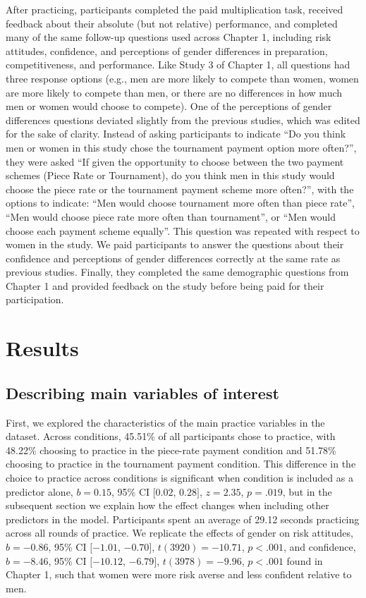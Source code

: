 \documentclass[letterpaper, nobind]{templates/ociamthesis}
\begin{document}
After practicing, participants completed the paid multiplication task, received feedback about their absolute (but not relative) performance, and completed many of the same follow-up questions used across Chapter 1, including risk attitudes, confidence, and perceptions of gender differences in preparation, competitiveness, and performance. Like Study 3 of Chapter 1, all questions had three response options (e.g., men are more likely to compete than women, women are more likely to compete than men, or there are no differences in how much men or women would choose to compete). One of the perceptions of gender differences questions deviated slightly from the previous studies, which was edited for the sake of clarity. Instead of asking participants to indicate ``Do you think men or women in this study chose the tournament payment option more often?'', they were asked ``If given the opportunity to choose between the two payment schemes (Piece Rate or Tournament), do you think men in this study would choose the piece rate or the tournament payment scheme more often?'', with the options to indicate: ``Men would choose tournament more often than piece rate'', ``Men would choose piece rate more often than tournament'', or ``Men would choose each payment scheme equally''. This question was repeated with respect to women in the study. We paid participants to answer the questions about their confidence and perceptions of gender differences correctly at the same rate as previous studies. Finally, they completed the same demographic questions from Chapter 1 and provided feedback on the study before being paid for their participation.

\hypertarget{results-3}{%
\section{Results}\label{results-3}}

\hypertarget{describing-main-variables-of-interest-3}{%
\subsection{Describing main variables of interest}\label{describing-main-variables-of-interest-3}}

First, we explored the characteristics of the main practice variables in the dataset. Across conditions, 45.51\% of all participants chose to practice, with 48.22\% choosing to practice in the piece-rate payment condition and 51.78\% choosing to practice in the tournament payment condition. This difference in the choice to practice across conditions is significant when condition is included as a predictor alone, \(b = 0.15\), 95\% CI \([0.02\), \(0.28]\), \(z = 2.35\), \(p = .019\), but in the subsequent section we explain how the effect changes when including other predictors in the model. Participants spent an average of 29.12 seconds practicing across all rounds of practice. We replicate the effects of gender on risk attitudes, \(b = -0.86\), 95\% CI \([-1.01\), \(-0.70]\), \(t(3920) = -10.71\), \(p < .001\), and confidence, \(b = -8.46\), 95\% CI \([-10.12\), \(-6.79]\), \(t(3978) = -9.96\), \(p < .001\) found in Chapter 1, such that women were more risk averse and less confident relative to men.
\end{document}
